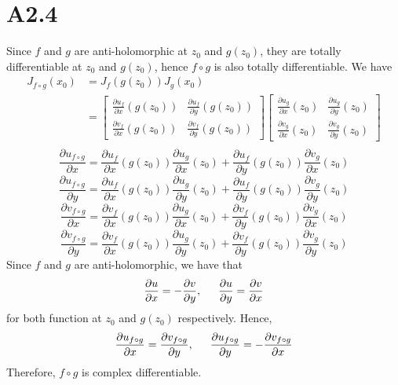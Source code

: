 \documentclass[11pt]{report}
\begin{document}
\section*{A2.4}
Since $f$ and $g$ are anti-holomorphic at $z_0$ and $g(z_0)$, they are totally differentiable at $z_0$ and $g(z_0)$,
hence $f \circ g$ is also totally differentiable. We have
\begin{equation*}
    \begin{aligned}
        J_{f\circ g}(x_0) &= J_f(g(z_0))J_g(x_0) \\
        &=
        \begin{bmatrix}
            \frac{\partial u_f}{\partial x}(g(z_0)) & \frac{\partial u_f}{\partial y}(g(z_0)) \\
            \frac{\partial v_f}{\partial x}(g(z_0)) & \frac{\partial v_f}{\partial y}(g(z_0))
        \end{bmatrix}
        \begin{bmatrix}
            \frac{\partial u_g}{\partial x}(z_0) & \frac{\partial u_g}{\partial y}(z_0) \\
            \frac{\partial v_g}{\partial x}(z_0) & \frac{\partial v_g}{\partial y}(z_0)
        \end{bmatrix} \\
    \end{aligned}
\end{equation*}
\[
    \frac{\partial u_{f \circ g}}{\partial x} = \frac{\partial u_f}{\partial x}(g(z_0)) \frac{\partial u_g}{\partial x}(z_0) + \frac{\partial u_f}{\partial y}(g(z_0)) \frac{\partial v_g}{\partial x}(z_0) 
\]
\[
    \frac{\partial u_{f \circ g}}{\partial y} = \frac{\partial u_f}{\partial x}(g(z_0)) \frac{\partial u_g}{\partial y}(z_0) + \frac{\partial u_f}{\partial y}(g(z_0)) \frac{\partial v_g}{\partial y}(z_0) 
\]
\[
    \frac{\partial v_{f \circ g}}{\partial x} = \frac{\partial v_f}{\partial x}(g(z_0)) \frac{\partial u_g}{\partial x}(z_0) + \frac{\partial v_f}{\partial y}(g(z_0)) \frac{\partial v_g}{\partial x}(z_0) 
\]
\[
    \frac{\partial v_{f \circ g}}{\partial y} = \frac{\partial v_f}{\partial x}(g(z_0)) \frac{\partial u_g}{\partial y}(z_0) + \frac{\partial v_f}{\partial y}(g(z_0)) \frac{\partial v_g}{\partial y}(z_0) 
\]
Since $f$ and $g$ are anti-holomorphic, we have that 
\[
    \frac{\partial u}{\partial x} = -\frac{\partial v}{\partial y}, \indent \frac{\partial u}{\partial y} = \frac{\partial v}{\partial x}
\]
for both function at $z_0$ and $g(z_0)$ respectively. Hence, 
\[
    \frac{\partial u_{f \circ g}}{\partial x} = \frac{\partial v_{f \circ g}}{\partial y}, \indent \frac{\partial u_{f \circ g}}{\partial y} = -\frac{\partial v_{f \circ g}}{\partial x}    
\]
Therefore, $f \circ g$ is complex differentiable.
\newpage
\end{document}
